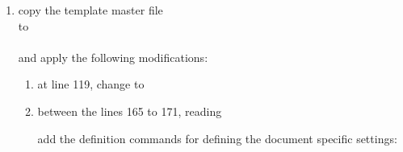 \begin{enumerate}
\item copy the template master file \\
   to \\
   \\
  and apply the following modifications:
  \begin{enumerate}
  \item at line 119, change  to 
  \item between the lines 165 to 171, reading
    \begin{CommandLineListing}[style=DefaultFileListing, print=true, basicstyle={\ttfamily\small}, %
      basewidth=0.47em, xleftmargin=0pt, gobble=6]
      \makeatletter
      \makeatother
    \end{CommandLineListing}
    add the definition commands for defining the document specific settings:
    \begin{CommandLineListing}[style=DefaultFileListing, print=true, basicstyle={\ttfamily\small}, %
      basewidth=0.47em, xleftmargin=0pt, gobble=6]
      \makeatletter

      \renewcommand*{\ThisDocType}{%
        tr%
      }
      \renewcommand*{\ThisDocExtNum}{%
        03%
      }
      \renewcommand*{\ThisDocIntNum}{%
        37%
      }
      \renewcommand*{\ThisDocIssue}{%
        1%
      }
      \renewcommand*{\ThisDocRevision}{%
        3%
      }
      \renewcommand*{\subtitlePrefix}{%
      }
      \renewcommand*{\ThisDocSubtitle}{%
        WLG Quickstart Guide%
      }
      \renewcommand*{\ThisDocHeaderTitleSubstr}{%
        \wegcLaTeX{}%
      }
      \renewcommand*{\ThisDocIdSubstr}{%
        \aces{wegc}-WLG-QSG%
      }
      \renewcommand*{\ThisDocDate}{%
        \displaydate{ThisDocDate}%
      }
      \renewcommand*{\ThisDocYear}{%
        2028%
      }
      \renewcommand*{\ThisDocTitle}{%
        The \wegcLaTeX{} documentation framework: \newline a guide for beginners%
      }
      \renewcommand*{\titlePrefix}{%
      }
      \renewcommand*{\ThisDocAuthors}{%
        \ShortName{kmf}, \ShortName{jfb}, and \ShortName{gki}%
      }
      \makeatother
    \end{CommandLineListing}


\end{enumerate}
\end{enumerate}
